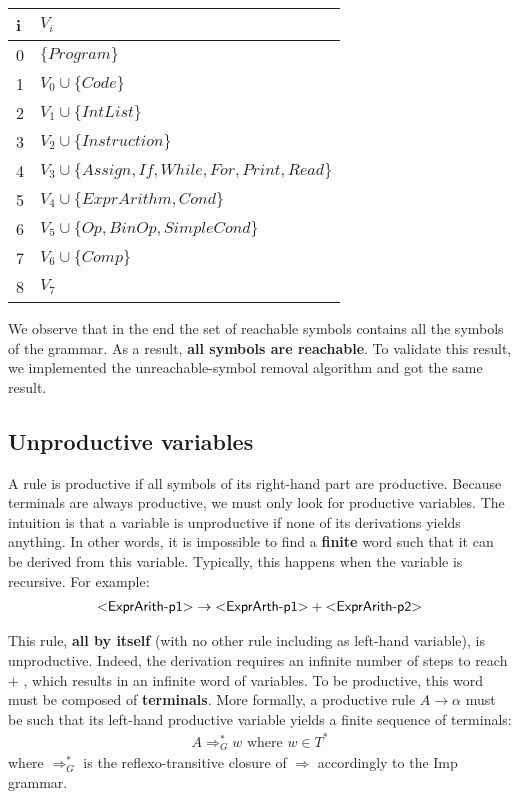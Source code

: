 \begin{tabular}{|l p{35em}|} \hline
   i & $V_i$ \\ \hline
  0 & $\{Program\}$ \\ \hline
  1 & $V_0 \cup \{Code\}$ \\ \hline
  2 & $V_1 \cup \{IntList\}$ \\ \hline
  3 & $V_2 \cup \{Instruction\}$ \\ \hline
  4 & $V_3 \cup \{Assign, If, While, For, Print, Read\}$ \\ \hline
  5 & $V_4 \cup \{ExprArithm, Cond\}$ \\ \hline
  6 & $V_5 \cup \{Op, BinOp, SimpleCond\}$ \\ \hline
  7 & $V_6 \cup \{Comp\}$ \\ \hline
  8 & $V_7$ \\ \hline
\end{tabular}

We observe that in the end the set of reachable symbols contains all the symbols of the grammar. As a result, \textbf{all symbols are reachable}.
To validate this result, we implemented the unreachable-symbol removal algorithm and got the same result.

\subsection{Unproductive variables}

A rule is productive if all symbols of its right-hand part are productive. Because terminals are always productive, we must only look for
productive variables. The intuition is that a variable is unproductive if none of its derivations yields anything. In other words, it is impossible to find a \textbf{finite} word such that it can be derived from this variable. Typically, this happens when the variable is recursive. For example:
\begin{equation}
  \begin{split}
    \varstyle{ExprArith-p1} \rightarrow \varstyle{ExprArth-p1} + \varstyle{ExprArith-p2}
   \end{split}
\end{equation}

This rule, \textbf{all by itself} (with no other rule including  as left-hand variable), is unproductive.
Indeed, the derivation requires an infinite number of steps to reach $ + $ , which results in an infinite word of variables.
To be productive, this word must be composed of \textbf{terminals}.
More formally, a productive rule $A \rightarrow \alpha$ must be such that its left-hand productive variable yields a finite sequence of terminals:
\begin{equation}
  \begin{split}
    A \Rightarrow_{G}^{*} w \text{ where } w \in T^{*}
  \end{split}
\end{equation}
where $\Rightarrow_{G}^{*}$ is the reflexo-transitive closure of $\Rightarrow$ accordingly to the Imp grammar.

